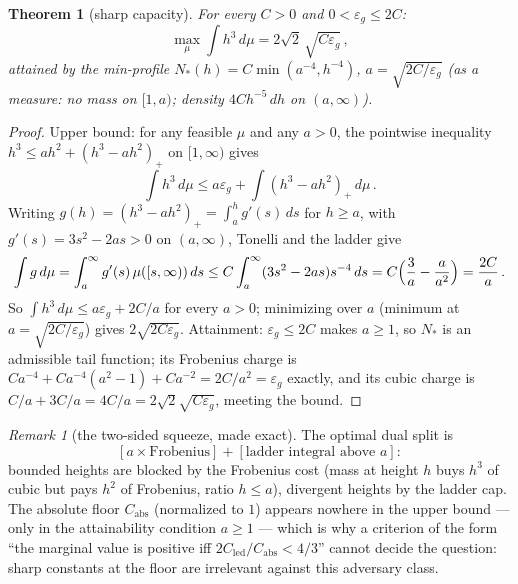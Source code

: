 \documentclass[11pt]{article}
\theoremstyle{plain}
\newtheorem{theorem}{Theorem}[section]
\theoremstyle{definition}
\theoremstyle{remark}
\newtheorem*{remk}{Remark}
\newcommand{\Cled}{C_{\mathrm{led}}}
\begin{document}
\begin{theorem}[sharp capacity]
\label{thm:capacity}
For every $C > 0$ and $0 < \varepsilon_g \le 2C$:
\[
  \max_\mu \int h^3\, d\mu = 2\sqrt{2}\,\sqrt{C \varepsilon_g}\,,
\]
attained by the min-profile $N_*(h) = C\min(a^{-4}, h^{-4})$,
$a = \sqrt{2C/\varepsilon_g}$ (as a measure: no mass on $[1, a)$; density
$4 C h^{-5}\, dh$ on $(a, \infty)$).
\end{theorem}

\begin{proof}
Upper bound: for any feasible $\mu$ and any $a > 0$, the pointwise inequality
$h^3 \le a h^2 + (h^3 - a h^2)_+$ on $[1, \infty)$ gives
\[
  \int h^3\, d\mu \le a \varepsilon_g + \int (h^3 - a h^2)_+\, d\mu \,.
\]
Writing $g(h) = (h^3 - a h^2)_+ = \int_a^h g'(s)\, ds$ for $h \ge a$, with
$g'(s) = 3 s^2 - 2 a s > 0$ on $(a, \infty)$, Tonelli and the ladder give
\[
  \int g\, d\mu = \int_a^\infty g'(s)\, \mu([s, \infty))\, ds
  \le C \int_a^\infty (3 s^2 - 2 a s) s^{-4}\, ds
  = C\Bigl( \frac{3}{a} - \frac{a}{a^2} \Bigr)
  = \frac{2C}{a} \,.
\]
So $\int h^3\, d\mu \le a \varepsilon_g + 2C/a$ for every $a > 0$; minimizing
over $a$ (minimum at $a = \sqrt{2C/\varepsilon_g}$) gives
$2\sqrt{2 C \varepsilon_g}$. Attainment: $\varepsilon_g \le 2C$ makes
$a \ge 1$, so $N_*$ is an admissible tail function; its Frobenius charge is
$C a^{-4} + C a^{-4}(a^2 - 1) + C a^{-2} = 2C/a^2 = \varepsilon_g$ exactly, and
its cubic charge is $C/a + 3C/a = 4C/a = 2\sqrt{2}\sqrt{C \varepsilon_g}$,
meeting the bound.
\end{proof}

\begin{remk}[the two-sided squeeze, made exact]
The optimal dual split is
\[
  [a \times \text{Frobenius}] + [\text{ladder integral above } a] :
\]
bounded heights are blocked by the Frobenius cost (mass at height $h$ buys $h^3$
of cubic but pays $h^2$ of Frobenius, ratio $h \le a$), divergent heights by the
ladder cap. The absolute floor $C_{\mathrm{abs}}$ (normalized to $1$) appears
nowhere in the upper bound --- only in the attainability condition $a \ge 1$ ---
which is why a criterion of the form ``the marginal value is positive iff
$2\Cled/C_{\mathrm{abs}} < 4/3$'' cannot decide the question: sharp constants at
the floor are irrelevant against this adversary class.
\end{remk}
\end{document}
